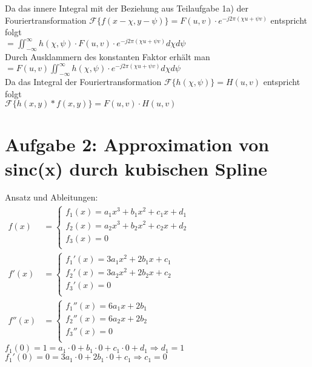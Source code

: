 \documentclass[a4paper,11pt,oneside]{scrartcl}
\begin{document}
Da das innere Integral mit der Beziehung aus Teilaufgabe 1a) der Fouriertransformation $\mathcal{F}\{f(x-\chi,y-\psi)\}=F(u,v)\cdot e^{-j2\pi(\chi u+\psi v)}$ entspricht folgt \\

$=\iint_{-\infty}^{\infty}h(\chi,\psi)\cdot F(u,v)\cdot e^{-j2\pi(\chi u+\psi v)} d\chi d\psi$ \\

Durch Ausklammern des konstanten Faktor erhält man \\

$=F(u,v)\iint_{-\infty}^{\infty}h(\chi,\psi)\cdot e^{-j2\pi(\chi u+\psi v)} d\chi d\psi$ \\

Da das Integral der Fouriertransformation $\mathcal{F}\{h(\chi,\psi)\}=H(u,v)$ entspricht folgt \\

$\mathcal{F}\{h(x,y)\ast f(x,y)\}=F(u,v)\cdot H(u,v)$

\newpage

\section*{Aufgabe 2: Approximation von sinc(x) durch kubischen Spline}

Ansatz und Ableitungen:\\
\begin{math}
\begin{array}{ll}
f(x) & = 
 \left\{ 
  \begin{array}{l}
   f_1(x) = a_1x^3 + b_1x^2 + c_1x + d_1\\
   f_2(x) = a_2x^3 + b_2x^2 + c_2x + d_2\\
   f_3(x) = 0\\
  \end{array} 
 \right.
\\[0.5cm]
f'(x) & = 
 \left\{ 
  \begin{array}{l}
   f_1'(x) = 3a_1x^2 + 2b_1x + c_1 \\
   f_2'(x) = 3a_2x^2 + 2b_2x + c_2 \\
   f_3'(x) = 0\\
  \end{array} 
 \right.
\\[0.5cm]
f''(x) & = 
 \left\{
  \begin{array}{l}
   f_1''(x) = 6a_1x + 2b_1\\
   f_2''(x) = 6a_2x + 2b_2\\
   f_3''(x) = 0\\
  \end{array}
 \right.
 \end{array}
\end{math}\\
$f_1(0) = 1 = a_1 \cdot 0 + b_1 \cdot 0 + c_1 \cdot 0 + d_1 \Rightarrow d_1 = 1$\\
$f_1'(0) = 0 = 3a_1 \cdot 0 + 2b_1 \cdot 0 + c_1 \Rightarrow c_1 = 0$\\
\end{document}
